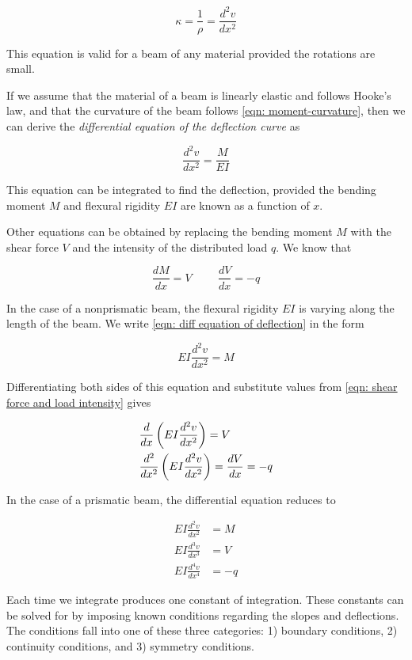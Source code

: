 \documentclass[a4paper,openany,12pt]{book}
\begin{document}
\begin{enumerate}
$$\kappa  = \frac{1}{\rho } = \frac{d^2v}{dx^2}$$

This equation is valid for a beam of any material provided the rotations
are small.

If we assume that the material of a beam is linearly elastic and follows
Hooke's law, and that the curvature of the beam follows
\ref{eqn: moment-curvature}, then we can derive
the \emph{differential equation of the deflection curve} as

$$\frac{d^2v}{dx^2} = \frac{M}{EI}$$

This equation can be integrated to find the deflection, provided the
bending moment \(M\) and flexural rigidity \(EI\) are known as a function of
\(x\).

Other equations can be obtained by replacing the bending moment \(M\) with
the shear force \(V\) and the intensity of the distributed load \(q\). We
know that

$$\frac{dM}{dx} = V \hspace{1cm} \frac{dV}{dx} =  - q$$

In the case of a nonprismatic beam, the flexural rigidity \(EI\) is
varying along the length of the beam. We write
\ref{eqn: diff equation of deflection}
in the form

$$EI\frac{d^2v}{dx^2} = M$$

Differentiating both sides of this equation and substitute values from
\ref{eqn: shear force and load intensity}
gives

$$\begin{gathered}
    \frac{d}{dx}\left( EI\frac{d^2v}{dx^2} \right) = V \hfill \\
    \frac{d^2}{dx^2}\left( EI\frac{d^2v}{dx^2} \right) = \frac{dV}{dx} =  -q \hfill \\ 
  \end{gathered}$$

In the case of a prismatic beam, the differential equation reduces to

$$\begin{aligned}
  EI\frac{d^2v}{dx^2} &= M \nonumber \\
  EI\frac{d^3v}{dx^3} &= V \nonumber \\
  EI\frac{d^4v}{dx^4} &=  - q \end{aligned}$$

Each time we integrate produces one constant of integration. These
constants can be solved for by imposing known conditions regarding the
slopes and deflections. The conditions fall into one of these three
categories: 1) boundary conditions, 2) continuity conditions, and 3)
symmetry conditions.


\end{enumerate}
\end{document}
